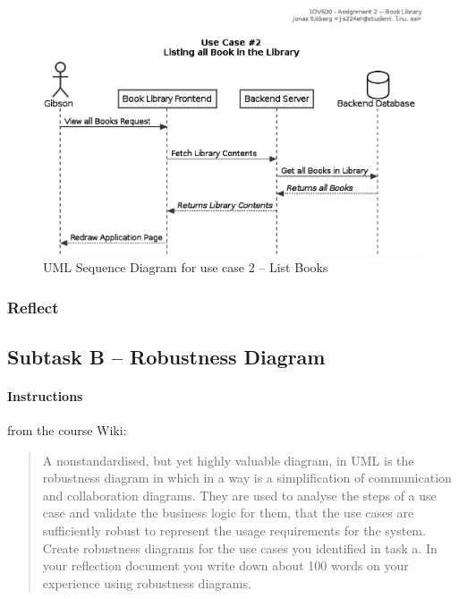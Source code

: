 \begin{figure}[htbp]
  \centering
  \includegraphics[width=0.75\linewidth]{include/uml-use-case-2-seq.eps}
  \caption{UML Sequence Diagram for use case 2 -- List Books}
  \label{fig:uml-usecase2seq}
\end{figure}


\subsubsection{Reflect}\label{task-1a-reflect}
%



\subsection{Subtask B -- Robustness Diagram}\label{task-1b}
\paragraph{Instructions}\label{task-1b-instructions}
from the course Wiki\cite{1dv600:lab2:instructions}:

\begin{quote}
  A non­standardised, but yet highly valuable diagram, in UML is the robustness
  diagram in which in a way is a simplification of communication and
  collaboration diagrams. They are used to analyse the steps of a use case and
  validate the business logic for them, that the use cases are sufficiently
  robust to represent the usage requirements for the system.  Create robustness
  diagrams for the use cases you identified in task a. In your reflection
  document you write down about 100 words on your experience using robustness
  diagrams.
\end{quote}


